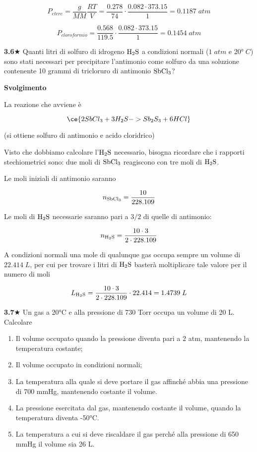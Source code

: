 $$P_{etere}=\frac{g}{MM}\frac{RT}{V}=\frac{0.278}{74}\cdot\frac{0.082 \cdot 373.15}{1}=0.1187\;atm$$

$$P_{cloroformio}=\frac{0.568}{119.5}\cdot\frac{0.082 \cdot 373.15}{1}=0.1454\;atm$$

\vspace{0.2cm}\textbf{3.6}$\bigstar$ Quanti litri di solfuro di idrogeno $\rm H_2S$ a condizioni normali ($1\;atm$ e 20°$\;C$) sono stati necessari per precipitare l'antimonio come solfuro da una soluzione contenente 10 grammi di tricloruro di antimonio $\rm SbCl_3$?

\vspace{0.2cm}\large\textbf{Svolgimento}\normalsize

\vspace{0.2cm}La reazione che avviene è

$$\ce{2SbCl_3 + 3H_2S -> Sb_2S_3 + 6HCl}$$

(si ottiene solfuro di antimonio e acido cloridrico)

Visto che dobbiamo calcolare l'$\rm H_2S$ necessario, bisogna ricordare che i rapporti stechiometrici sono: due moli di $\rm SbCl_3$ reagiscono con tre moli di $\rm H_2S$.

Le moli iniziali di antimonio saranno

$$n_{\rm SbCl_3}=\frac{10}{228.109}$$

Le moli di $\rm H_2S$ necessarie saranno pari a $3/2$ di quelle di antimonio:

$$n_{\rm H_2S}=\frac{10 \cdot 3}{2 \cdot 228.109}$$

A condizioni normali una mole di qualunque gas occupa sempre un volume di $22.414\;L$, per cui per trovare i litri di $\rm H_2S$ basterà moltiplicare tale valore per il numero di moli

$$L_{\rm H_2S}=\frac{10 \cdot 3}{2 \cdot 228.109} \cdot 22.414
=1.4739\;L$$

\vspace{0.2cm}\textbf{3.7}$\bigstar$ Un gas a 20°C e alla pressione di 730 Torr occupa un volume di 20 L. Calcolare

\begin{enumerate}
    \item Il volume occupato quando la pressione diventa pari a 2 atm, mantenendo la temperatura costante;
    \item Il volume occupato in condizioni normali;
    \item La temperatura alla quale si deve portare il gas affinché abbia una pressione di 700 mmHg, mantenendo costante il volume.
    \item La pressione esercitata dal gas, mantenendo costante il volume, quando la temperatura diventa -50°C.
    \item La temperatura a cui si deve riscaldare il gas perché alla pressione di 650 mmHg il volume sia 26 L.
\end{enumerate}

